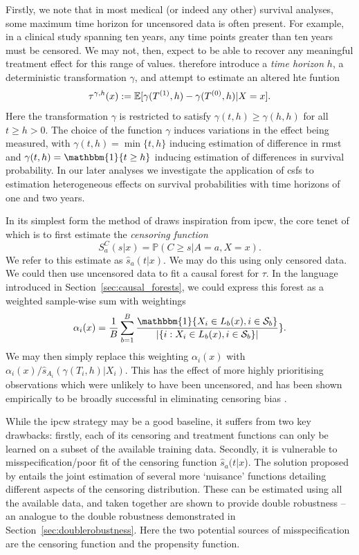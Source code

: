 \documentclass[../thesis.tex]{subfiles}
\begin{document}
Firstly, we note that in most medical (or indeed any other) survival analyses, some maximum time horizon for uncensored data is often present. For example, in a clinical study spanning ten years, any time points greater than ten years must be censored. We may not, then, expect to be able to recover any meaningful treatment effect for this range of values. \citet{cui_estimating_2022} therefore introduce a \emph{time horizon} $h$, a deterministic transformation $\gamma$, and attempt to estimate an altered \gls{hte} funtion
\[\tau^{\gamma, h}(x) := \mathbb{E}[\gamma(T^{(1)}, h) - \gamma(T^{(0)}, h) | X = x].\]
Here the transformation $\gamma$ is restricted to satisfy $\gamma(t, h) \geq \gamma(h, h)$ for all $t \geq h>0$. The choice of the function $\gamma$ induces variations in the effect being measured, with $\gamma(t,h) = \min\{t,h\}$ inducing estimation of difference in \gls{rmst} and $\gamma(t,h) = \mathbbm{1}\{t \geq h \}$ inducing estimation of differences in survival probability. In our later analyses we investigate the application of \glspl{csf} to estimation heterogeneous effects on survival probabilities with time horizons of one and two years.

In its simplest form the method of \citet{cui_estimating_2022} draws inspiration from \gls{ipcw}, the core tenet of which is to first estimate the \emph{censoring function} 
\[S_a^C(s|x) = \mathbb{P}(C \geq s | A = a, X = x).\]
We refer to this estimate as $\hat{s}_a(t|x)$. We may do this using only censored data. We could then use uncensored data to fit a causal forest for $\tau$. In the language introduced in Section~\ref{sec:causal_forests}, we could express this forest as a weighted sample-wise sum with weightings 
\[\alpha_i(x)  = \frac{1}{B}\sum_{b=1}^B\frac{\mathbbm{1}\{X_i \in L_b(x), i \in \mathcal{S}_b\}}{|\{i: X_i \in L_b(x), i \in \mathcal{S}_b\}|}\}.\]
We may then simply replace this weighting $\alpha_i(x)$ with $\alpha_i(x)/ \hat{s}_{A_i}(\gamma(T_i, h) | X_i)$. This has the effect of more highly prioritising observations which were unlikely to have been uncensored, and has been shown empirically to be broadly successful in eliminating censoring bias \citep{van_der_laan_unified_2003}.

While the \gls{ipcw} strategy may be a good baseline, it suffers from two key drawbacks: firstly, each of its censoring and treatment functions can only be learned on a subset of the available training data. Secondly, it is vulnerable to misspecification/poor fit of the censoring function $\hat{s}_a(t|x$). The solution proposed by \citet{cui_estimating_2022} entails the joint estimation of several more `nuisance' functions detailing different aspects of the censoring distribution. These can be estimated using all the available data, and taken together are shown to provide double robustness -- an analogue to the double robustness demonstrated in Section~\ref{sec:doublerobustness}. Here the two potential sources of misspecification are the censoring function and the propensity function.
\end{document}
